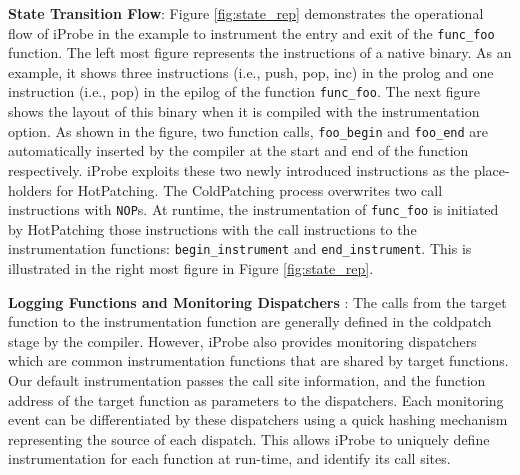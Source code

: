 \noindent \textbf{State Transition Flow}: \quad Figure \ref{fig:state_rep} demonstrates the operational flow of iProbe in the example to instrument the entry and exit of the \texttt{func\_foo} function. 
The left most figure represents the instructions of a native binary. 
As an example, it shows three instructions (i.e., push, pop, inc) in the prolog and one instruction (i.e., pop) in the epilog of the function \texttt{func\_foo}. 
The next figure shows the layout of this binary when it is compiled with the instrumentation option. 
As shown in the figure, two function calls, \texttt{foo\_begin} and \texttt{foo\_end} are automatically inserted by the compiler at the start and end of the function respectively. 
iProbe exploits these two newly introduced instructions as the place-holders for HotPatching. 
The ColdPatching process overwrites two call instructions with \texttt{NOP}s. 
At runtime, the instrumentation of \texttt{func\_foo} is initiated by HotPatching those instructions with the call instructions to the instrumentation functions: \texttt{begin\_instrument} and \texttt{end\_instrument}. 
This is illustrated in the right most figure in Figure \ref{fig:state_rep}.

\noindent \textbf{Logging Functions and Monitoring Dispatchers} : \quad
%
The calls from the target function to the instrumentation function are generally defined in the coldpatch stage by the compiler. 
However, iProbe also provides monitoring dispatchers which are common instrumentation functions that are shared by target functions. 
Our default instrumentation passes the call site information, and the function address of the target function as parameters to the dispatchers. 
Each monitoring event can be differentiated by these dispatchers using a quick hashing mechanism representing the source of each dispatch.
This allows iProbe to uniquely define instrumentation for each function at run-time, and identify its call sites.





